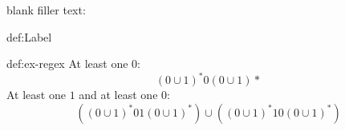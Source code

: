 \documentclass[landscape, 8pt]{extarticle}
\begin{document}
\begin{multicols}{3}
blank filler text: \lipsum[1-12]



\begin{dfn}[Name]{def:Label}{}

\end{dfn}

\newpage
\begin{xmp}{def:ex-regex}{}
At least one $0$:
\[(0\cup 1) ^{*} 0(0\cup 1)*\]
At least one $1$ and at least one $0$:
\[((0 \cup 1)^*01(0 \cup 1)^*) \cup ((0 \cup 1)^*10(0 \cup 1)^*)\]
\end{xmp}

\end{multicols}
\end{document}
